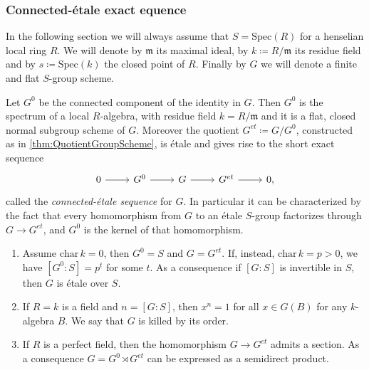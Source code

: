 \documentclass[../Main]{subfiles}
\begin{document}
\subsubsection{Connected-étale exact equence}
In the following section we will always assume that 
$S = \mathrm{Spec}(R)$	for a henselian local ring $R$.
We will denote by $\mathfrak{m}$ its maximal ideal, by $k \coloneqq R/\mathfrak{m}$
its residue field and by $s \coloneqq \mathrm{Spec}(k)$ the closed point of $R$.
Finally by $G$ we will denote a finite and flat $S$-group scheme.

\begin{thm}
	Let $G^0$ be the connected component of the identity in $G$.
	Then $G^0$ is the spectrum of a local $R$-algebra, with residue field $k = R/\mathfrak{m}$
	and it is a flat, closed normal subgroup scheme of $G$.
	Moreover the quotient $G^{et} \coloneqq G/G^0$,
	constructed as in \cref{thm:QuotientGroupScheme},
	is étale and gives rise to the short exact sequence
	\begin{equation*}
	\begin{tikzcd}
		0 \arrow[r, "", rightarrow] &
		G^0 \arrow[r, "", rightarrow] &
		G \arrow[r, "", rightarrow] &
		G^{et} \arrow[r, "", rightarrow] &
		0
	,\end{tikzcd}
	\end{equation*}
	called the {\em connected-étale sequence} for $G$.
	In particular it can be characterized by the fact that every homomorphism
	from $G$ to an étale $S$-group factorizes through $G \to G^{et}$,
	and $G^0$ is the kernel of that homomorphism.
\end{thm}


\begin{prop}\leavevmode\vspace{-.2\baselineskip}
\begin{enumerate}
	\item Assume $\mathrm{char}\, k = 0$, then $G^0 = S$
		and $G = G^{et}$.
		If, instead, $\mathrm{char}\, k = p > 0$, we have
		$[G^0:S] = p^t$ for some $t$.
		As a consequence if $[G:S]$ is invertible in $S$, then
		$G$ is étale over $S$.

	\item If $R = k$ is a field and $n = [G:S]$, then $x^n = 1$
		for all $x \in G(B)$ for any $k$-algebra $B$.
		We say that $G$ is killed by its order.

	\item If $R$ is a perfect field, then the homomorphism
		$G \to  G^{et}$ admits a section. 
		As a consequence $G = G^0 \rtimes G^{et}$
		can be expressed as a semidirect product.
\end{enumerate}
\end{prop}
\end{document}
